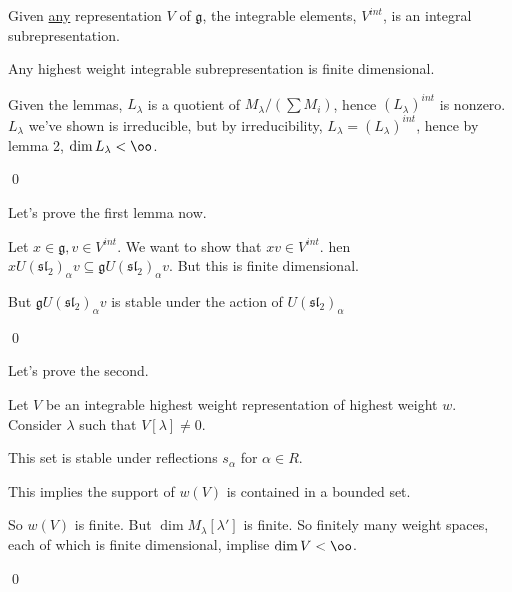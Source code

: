 \documentclass[x11names,reqno,14pt]{extarticle}
\newcommand{\mk}[1]{\mathfrak{#1}}
\newcommand{\g}{\mk{g}}
\renewcommand{\sl}{\mk{s}\mk{l}}
\begin{document}
\lem

Given \underline{any} representation $V$ of $\g$, the integrable elements, $V^{int}$, is an integral subrepresentation. 

\lem

Any highest weight integrable subrepresentation is finite dimensional. 

\proof

Given the lemmas, $L_\lambda$ is a quotient of $M_\lambda / (\sum M_i)$, hence $(L_\lambda)^{int}$ is nonzero. $L_\lambda$ we've shown is irreducible, but by irreducibility, $L_\lambda = (L_\lambda)^{int}$, hence by lemma 2, $\dim L_\lambda<\oo$. 

\qed

Let's prove the first lemma now.

\proof

Let $x \in \g, v \in V^{int}$. We want to show that $xv \in V^{int}$. hen $xU(\sl_2)_\alpha v \subseteq \g U(\sl_2)_\alpha v$. But this is finite dimensional. 

But $\g U(\sl_2)_\alpha v$ is stable under the action of $U(\sl_2)_\alpha$

\qed

Let's prove the second. 

\proof

Let $V$ be an integrable highest weight representation of highest weight $w$. Consider $\lambda$ such that $V[\lambda]\neq0$. 

This set is stable under reflections $s_\alpha$ for $\alpha \in R$. 

This implies the support of $w(V)$ is contained in a bounded set.

So $w(V)$ is finite. But $\dim M_\lambda[\lambda']$ is finite. So finitely many weight spaces, each of which is finite dimensional, implise $\dim V < \oo$. 

\qed
\end{document}
